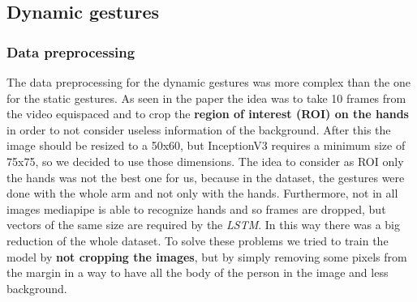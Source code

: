 \documentclass[10pt,twocolumn,letterpaper]{article}
\begin{document}
\subsection{Dynamic gestures}
\subsubsection{Data preprocessing}
\label{subsec:datapreprocessing}
The data preprocessing for the dynamic gestures was more complex than the one for the static gestures. As seen in the paper \cite{electronics13163233} the idea was to take 10 frames from the video equispaced and to crop the \textbf{region of interest (ROI) on the hands} in order to not consider useless information of the background.
After this the image should be resized to a 50x60, but InceptionV3 requires a minimum size 
of 75x75, so we decided to use those dimensions.
The idea to consider as ROI only the hands was not the best one for us, because in the dataset, the gestures were done with the whole 
arm and not only with the hands. Furthermore, not in all images mediapipe is able to recognize hands and so frames are dropped, 
but vectors of the same size are required by the \textit{LSTM}. In this way there was a big reduction of the whole dataset.
To solve these problems we tried to train the model by \textbf{not cropping the images}, but by simply removing some pixels from the margin in a way
to have all the body of the person in the image and less background.
\end{document}
